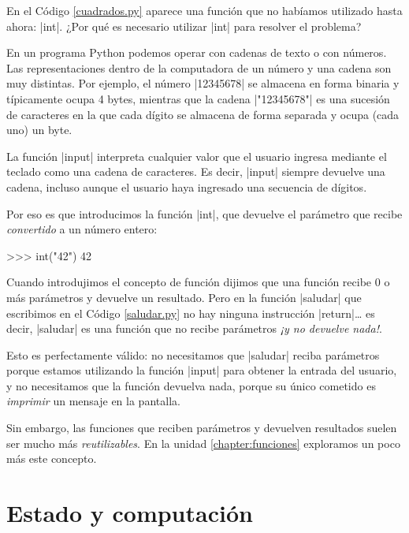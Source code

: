 En el Código \ref{cuadrados.py} aparece una función que no habíamos
utilizado hasta ahora: |int|. ¿Por qué es necesario utilizar |int| para
resolver el problema?

En un programa Python podemos operar con cadenas de texto o con números.  Las
representaciones dentro de la computadora de un número y una cadena son muy
distintas. Por ejemplo, el número |12345678| se almacena en forma binaria y
típicamente ocupa 4 bytes, mientras que la cadena |"12345678"| es una sucesión
de caracteres en la que cada dígito se almacena de forma separada y ocupa (cada
uno) un byte.

La función |input| interpreta cualquier valor que el usuario ingresa mediante
el teclado como una cadena de caracteres. Es decir, |input| siempre devuelve
una cadena, incluso aunque el usuario haya ingresado una secuencia de dígitos.

Por eso es que introducimos la función |int|, que devuelve el parámetro que
recibe {\it convertido} a un número entero:

\begin{codigo-python-sn}
>>> int("42")
42
\end{codigo-python-sn}

\begin{observacion}
Cuando introdujimos el concepto de función dijimos que una función recibe 0 o
más parámetros y devuelve un resultado. Pero en la función |saludar| que
escribimos en el Código \ref{saludar.py} no hay ninguna instrucción
|return|\ldots
es decir, |saludar| es una función que no recibe parámetros {\it ¡y no devuelve
nada!}.

Esto es perfectamente válido: no necesitamos que |saludar| reciba parámetros
porque estamos utilizando la función |input| para obtener la entrada del
usuario, y no necesitamos que la función devuelva nada, porque su único
cometido es {\it imprimir} un mensaje en la pantalla.

Sin embargo, las funciones que reciben parámetros y devuelven resultados suelen
ser mucho más {\it reutilizables}. En la unidad \ref{chapter:funciones}
exploramos un poco más este concepto.
\end{observacion}

%
%
\clearpage

\section{Estado y computación}

